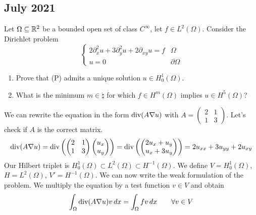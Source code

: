 \newpage
\subsection{July 2021}
\begin{exercise}
    Let \(\Omega \subseteq \mathbb{R}^2\) be a bounded open set of class \(C^\infty\), let \(f \in L^2(\Omega)\). Consider the Dirichlet problem
    \[
        \begin{cases}
            2\partial^2_{x} u + 3\partial^2_{y} u + 2\partial_{xy} u = f & \Omega         \\
            u = 0                                                        & \partial\Omega
        \end{cases}
        \tag*{(P)}
    \]
    \begin{enumerate}
        \item Prove that (P) admits a unique solution \(u \in H^1_0(\Omega)\).
        \item What is the minimum \(m \in \natural\) for which \(f \in H^m(\Omega)\) implies
              \(u \in H^5(\Omega)\)?
    \end{enumerate}
\end{exercise}
We can rewrite the equation in the form \(\text{div}( A \nabla u)\) with \(A = \begin{pmatrix} 2 & 1 \\ 1 & 3 \end{pmatrix}\). Let's check if \(A\) is the correct matrix.
\[
    \begin{split}
        \text{div}(A \nabla u) = \text{div}\left(\begin{pmatrix} 2 & 1 \\ 1 & 3 \end{pmatrix} \begin{pmatrix} u_x \\ u_y \end{pmatrix}\right) = \text{div}\left(\begin{pmatrix} 2u_x + u_y \\ u_x + 3u_y \end{pmatrix}\right) = 2u_{xx} + 3u_{yy} + 2u_{xy}
    \end{split}
\]
Our Hilbert triplet is \(H^1_0(\Omega) \subset L^2(\Omega) \subset
H^{-1}(\Omega)\). We define \(V = H^1_0(\Omega)\), \(H = L^2(\Omega)\), \(V' =
H^{-1}(\Omega)\). We can now write the weak formulation of the problem. We
multiply the equation by a test function \(v \in V\) and obtain
\[
    \int_\Omega \text{div}(A \nabla u) v \, dx = \int_\Omega f v \, dx \qquad \forall v \in V
\]
